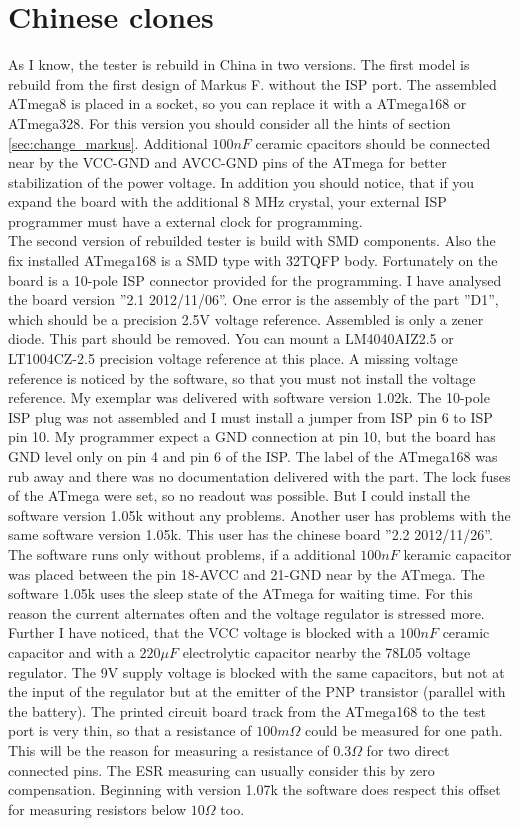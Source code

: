 \section{Chinese clones}
As I know, the tester is rebuild in China in two versions.
The first model is rebuild from the first design of Markus F. without the ISP port.
The assembled ATmega8 is placed in a socket, so you can replace it with a ATmega168 or ATmega328.
For this version you should consider all the hints of section \ref{sec:change_markus}.
Additional \(100nF\) ceramic cpacitors should be connected near by the VCC-GND and AVCC-GND pins of
the ATmega for better stabilization of the power voltage.
In addition you should notice, that if you expand the board with the additional 8 MHz crystal,
your external ISP programmer must have a external clock for programming.\\

The second version of rebuilded tester is build with SMD components. Also the fix installed ATmega168
is a SMD type with 32TQFP body.
Fortunately on the board is a 10-pole ISP connector provided for the programming.
I have analysed the board version ''2.1 2012/11/06''. One error is the assembly of the part ''D1'',
which should be a precision 2.5V voltage reference. Assembled is only a zener diode.
This part should be removed. You can mount a LM4040AIZ2.5 or LT1004CZ-2.5 precision voltage reference
at this place. A missing voltage reference is noticed by the software, so that you must not install
the voltage reference.
My exemplar was delivered with software version 1.02k. The 10-pole ISP plug was not assembled and I must
install a jumper from ISP pin 6 to ISP pin 10. My programmer expect a GND connection at pin 10, but the
board has GND level only on pin 4 and pin 6 of the ISP.
The label of the ATmega168 was rub away and there was no documentation delivered with the part.
The lock fuses of the ATmega were set, so no readout was possible.
But I could install the software version 1.05k without any problems.
Another user has problems with the same software version 1.05k. This user has the chinese board ''2.2 2012/11/26''.
The software runs only without problems, if a additional \(100nF\) keramic capacitor was placed between
the pin 18-AVCC and 21-GND near by the ATmega.
The software 1.05k uses the sleep state of the ATmega for waiting time. For this reason the current alternates
often and the voltage regulator is stressed more.
Further I have noticed, that the VCC voltage is blocked with a \(100nF\) ceramic capacitor and with a
\(220\mu F\) electrolytic capacitor nearby the 78L05 voltage regulator.
The 9V supply voltage is blocked with the same capacitors, but not at the input of the regulator but
at the emitter of the PNP transistor (parallel with the battery). 
The printed circuit board track from the ATmega168 to the test port is very thin, so that a resistance
of \(100m \Omega\) could be measured for one path. This will be the reason for measuring a resistance
of \(0.3 \Omega\) for two direct connected pins.
The ESR measuring can usually consider this by zero compensation.
Beginning with version 1.07k  the software does respect this offset for measuring resistors below \(10 \Omega\) too.

